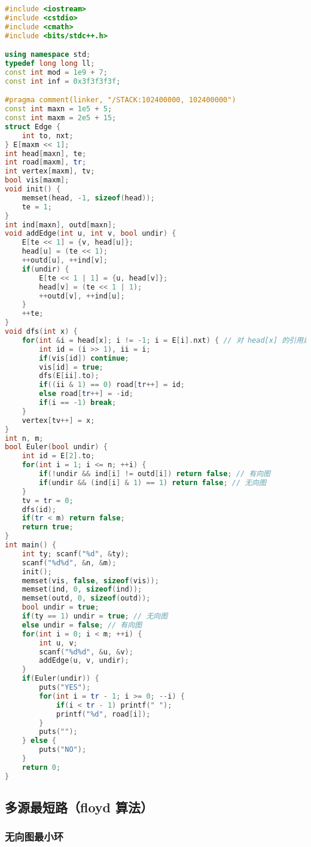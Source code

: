 \begin{lstlisting}[language=C++]
#include <iostream>
#include <cstdio>
#include <cmath>
#include <bits/stdc++.h>

using namespace std;
typedef long long ll;
const int mod = 1e9 + 7;
const int inf = 0x3f3f3f3f;

#pragma comment(linker, "/STACK:102400000, 102400000")
const int maxn = 1e5 + 5;
const int maxm = 2e5 + 15;
struct Edge {
    int to, nxt;
} E[maxm << 1];
int head[maxn], te;
int road[maxm], tr;
int vertex[maxm], tv;
bool vis[maxm];
void init() {
    memset(head, -1, sizeof(head));
    te = 1;
}
int ind[maxn], outd[maxn];
void addEdge(int u, int v, bool undir) {
    E[te << 1] = {v, head[u]};
    head[u] = (te << 1);
    ++outd[u], ++ind[v];
    if(undir) {
        E[te << 1 | 1] = {u, head[v]};
        head[v] = (te << 1 | 1);
        ++outd[v], ++ind[u];
    }
    ++te;
}
void dfs(int x) {
    for(int &i = head[x]; i != -1; i = E[i].nxt) { // 对 head[x] 的引用是降低复杂度关键
        int id = (i >> 1), ii = i;
        if(vis[id]) continue;
        vis[id] = true;
        dfs(E[ii].to);
        if((ii & 1) == 0) road[tr++] = id;
        else road[tr++] = -id;
        if(i == -1) break;
    }
    vertex[tv++] = x;
}
int n, m;
bool Euler(bool undir) {
    int id = E[2].to;
    for(int i = 1; i <= n; ++i) {
        if(!undir && ind[i] != outd[i]) return false; // 有向图
        if(undir && (ind[i] & 1) == 1) return false; // 无向图
    }
    tv = tr = 0;
    dfs(id);
    if(tr < m) return false;
    return true;
}
int main() {
    int ty; scanf("%d", &ty);
    scanf("%d%d", &n, &m);
    init();
    memset(vis, false, sizeof(vis));
    memset(ind, 0, sizeof(ind));
    memset(outd, 0, sizeof(outd));
    bool undir = true;
    if(ty == 1) undir = true; // 无向图
    else undir = false; // 有向图
    for(int i = 0; i < m; ++i) {
        int u, v;
        scanf("%d%d", &u, &v);
        addEdge(u, v, undir);
    }
    if(Euler(undir)) {
        puts("YES");
        for(int i = tr - 1; i >= 0; --i) {
            if(i < tr - 1) printf(" ");
            printf("%d", road[i]);
        }
        puts("");
    } else {
        puts("NO");
    }
    return 0;
}
\end{lstlisting}

\subsection{多源最短路（floyd 算法）}

\subsubsection{无向图最小环}

